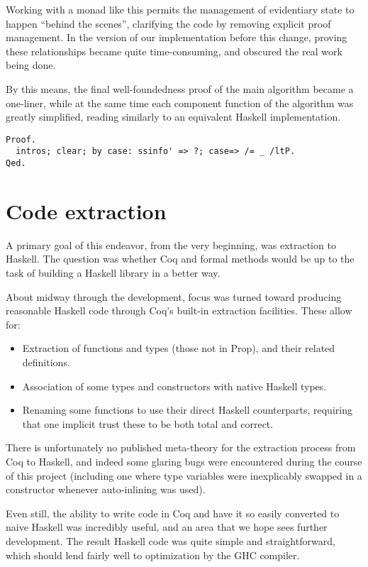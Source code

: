 \documentclass{llncs}
\begin{document}
Working with a monad like this permits the management of evidentiary state to
happen ``behind the scenes'', clarifying the code by removing explicit proof
management.  In the version of our implementation before this change, proving
these relationships became quite time-consuming, and obscured the real work
being done.

By this means, the final well-foundedness proof of the main algorithm became a
one-liner, while at the same time each component function of the algorithm was
greatly simplified, reading similarly to an equivalent Haskell implementation.

\begin{verbatim}
Proof.
  intros; clear; by case: ssinfo' => ?; case=> /= _ /ltP.
Qed.
\end{verbatim}

\section{Code extraction}
\label{sec:extract}

A primary goal of this endeavor, from the very beginning, was extraction to
Haskell.  The question was whether Coq and formal methods would be up to the
task of building a Haskell library in a better way.

About midway through the development, focus was turned toward producing
reasonable Haskell code through Coq's built-in extraction facilities.  These
allow for:

\begin{itemize}
\item Extraction of functions and types (those not in Prop), and their related
  definitions.

\item Association of some types and constructors with native Haskell types.

\item Renaming some functions to use their direct Haskell counterparts,
  requiring that one implicit trust these to be both total and correct.
\end{itemize}

There is unfortunately no published meta-theory for the extraction process
from Coq to Haskell, and indeed some glaring bugs were encountered during the
course of this project (including one where type variables were inexplicably
swapped in a constructor whenever auto-inlining was used).

Even still, the ability to write code in Coq and have it so easily converted
to naive Haskell was incredibly useful, and an area that we hope sees further
development.  The result Haskell code was quite simple and straightforward,
which should lend fairly well to optimization by the GHC compiler.
\end{document}
